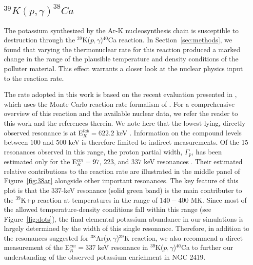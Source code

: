 \documentclass[twocolumn]{aastex6}
\newcommand{\nuclei}[2]{$^{#1}${#2}}
\newcommand{\pgreaction}[4]{\nuclei{#1}{#2}($p,\gamma$)\nuclei{#3}{#4}}
\begin{document}
\subsection{$^{39}K(p,\gamma)^{38}Ca$}
The potassium synthesized by the Ar-K nucleosynthesis chain is susceptible to destruction through the \pgreaction{39}{K}{40}{Ca} reaction. In Section~\ref{sec:methods}, we found that varying the thermonuclear rate for this reaction produced a marked change in the range of the plausible temperature and density conditions of the polluter material. This effect warrants a closer look at the nuclear physics input to the reaction rate.
\par
The rate adopted in this work is based on the recent evaluation presented in \citet{Longland_2016}, which uses the Monte Carlo reaction rate formalism of \cite{Longland_2010}. For a comprehensive overview of this reaction and the available nuclear data, we refer the reader to this work and the references therein. We note here that the lowest-lying, directly observed resonance is at E$_R^{lab}=622.2$ keV \citep{Kikstra_1990}. Information on the compound levels between $100$ and $500$ keV is therefore limited to indirect measurements. Of the 15 resonances observed in this range, the proton partial width, $\Gamma_p$, has been estimated only for the E$_R^{cm}=97$, $223$, and $337$ keV resonances \citep{Seth_1967,Cage_1971,Fuchs_1969}. Their estimated relative contributions to the reaction rate are illustrated in the middle panel of Figure~\ref{fig:38ar} alongside other important resonances. The key feature of this plot is that the $337$-keV resonance (solid green band) is the main contributer to the $^{39}$K+p reaction at temperatures in the range of $140-400$ MK. Since most of the allowed temperature-density conditions fall within this range (see Figure~\ref{fig:dots}), the final elemental potassium abundance in our simulations is largely determined by the width of this single resonance. Therefore, in addition to the resonances suggested for \pgreaction{38}{Ar}{39}{K} reaction, we also recommend a direct measurement of the E$_{R}^{cm}=337$ keV resonance in \pgreaction{39}{K}{40}{Ca} to further our understanding of the observed potassium enrichment in NGC 2419.
%
\par
%
\end{document}
